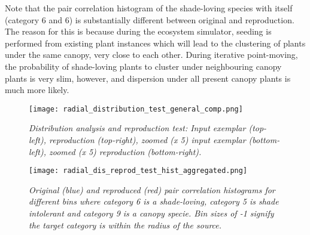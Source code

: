 Note that the pair correlation histogram of the shade-loving species with itself (category 6 and 6) is substantially different between original and reproduction. The reason for this is because during the ecosystem simulator, seeding is performed from existing plant instances which will lead to the clustering of plants under the same canopy, very close to each other. During iterative point-moving, the probability of shade-loving plants to cluster under neighbouring canopy plants is very slim, however, and dispersion under all present canopy plants is much more likely.

\begin{figure}
\center
	\texttt{[image: radial\_distribution\_test\_general\_comp.png]}
	\caption{ \textit{Distribution analysis and reproduction test: Input exemplar (top-left), reproduction (top-right), zoomed (x 5) input exemplar (bottom-left), zoomed (x 5) reproduction (bottom-right).} }	
	\label{fig:radial_dist_test}
\end{figure}

\begin{figure}
\center
	\texttt{[image: radial\_dis\_reprod\_test\_hist\_aggregated.png]}
	\caption{ \textit{Original (blue) and reproduced (red) pair correlation histograms for different bins where category 6 is a shade-loving, category 5 is shade intolerant and category 9 is a canopy specie. Bin sizes of -1 signify the target category is within the radius of the source.}}	
	\label{fig:hisogram_comp}
\end{figure}
